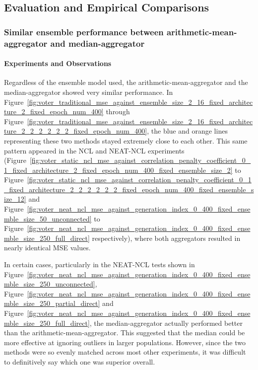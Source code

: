 \documentclass{article}
\begin{document}
\subsection{Evaluation and Empirical Comparisons}


\subsubsection{Similar ensemble performance between arithmetic-mean-aggregator and median-aggregator}
\paragraph{Experiments and Observations}
Regardless of the ensemble model used, the arithmetic-mean-aggregator and the median-aggregator showed very similar performance. In Figure~\ref{fig:voter_traditional_mse_against_ensemble_size_2_16_fixed_architecture_2_fixed_epoch_num_400} through Figure~\ref{fig:voter_traditional_mse_against_ensemble_size_2_16_fixed_architecture_2_2_2_2_2_2_fixed_epoch_num_400}, the blue and orange lines representing these two methods stayed extremely close to each other. This same pattern appeared in the NCL and NEAT-NCL experiments (Figure~\ref{fig:voter_static_ncl_mse_against_correlation_penalty_coefficient_0_1_fixed_architecture_2_fixed_epoch_num_400_fixed_ensemble_size_2} to Figure~\ref{fig:voter_static_ncl_mse_against_correlation_penalty_coefficient_0_1_fixed_architecture_2_2_2_2_2_2_fixed_epoch_num_400_fixed_ensemble_size_12} and Figure~\ref{fig:voter_neat_ncl_mse_against_generation_index_0_400_fixed_ensemble_size_50_unconnected} to Figure~\ref{fig:voter_neat_ncl_mse_against_generation_index_0_400_fixed_ensemble_size_250_full_direct} respectively), where both aggregators resulted in nearly identical MSE values. 

In certain cases, particularly in the NEAT-NCL tests shown in Figure~\ref{fig:voter_neat_ncl_mse_against_generation_index_0_400_fixed_ensemble_size_250_unconnected}, Figure~\ref{fig:voter_neat_ncl_mse_against_generation_index_0_400_fixed_ensemble_size_250_partial_direct} and Figure~\ref{fig:voter_neat_ncl_mse_against_generation_index_0_400_fixed_ensemble_size_250_full_direct}, the median-aggregator actually performed better than the arithmetic-mean-aggregator. This suggested that the median could be more effective at ignoring outliers in larger populations. However, since the two methods were so evenly matched across most other experiments, it was difficult to definitively say which one was superior overall. 
\end{document}
